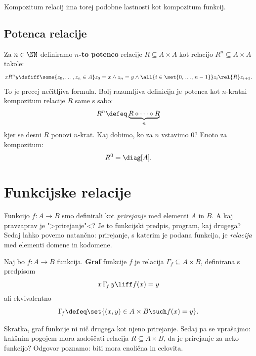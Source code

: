 Kompozitum relacij ima torej podobne lastnosti kot kompozitum funkcij.

\subsection{Potenca relacije}

Za $n \in \NN$ definiramo \textbf{$n$-to potenco} relacije $R \subseteq A \times A$ kot relacijo $R^n \subseteq A \times A$ takole:
%
\begin{equation*}
    x R^n y \defiff
    \some{z_0, \ldots, z_n \in A}
    z_0 = x \land z_n = y \land \all{i \in \set{0, \ldots, n-1}} z_i \rel{R} z_{i+1}.
\end{equation*}
%
To je precej nečitljiva formula. Bolj razumljiva definicija je potenca kot $n$-kratni kompozitum relacije $R$ same s sabo:
%
\begin{equation*}
    R^n \defeq \underbrace{R \circ \cdots \circ R}_n
\end{equation*}
%
kjer se desni $R$ ponovi $n$-krat. Kaj dobimo, ko za $n$ vstavimo $0$? Enoto za kompozitum:
%
\begin{equation*}
    R^0 = \diag[A].
\end{equation*}

\section{Funkcijske relacije}

Funkcijo $f : A \to B$ smo definirali kot \emph{prirejanje} med elementi $A$ in $B$. A
kaj pravzaprav je ">prirejanje"<? Je to funkcijski predpis, program, kaj drugega?
Sedaj lahko povemo natančno: prirejanje, s katerim je podana funkcija, je
\emph{relacija} med elementi domene in kodomene.

\begin{definicija}
  Naj bo $f : A \to B$ funkcija. \textbf{Graf} funkcije $f$ je relacija
  $\Gamma_f \subseteq A \times B$, definirana s predpisom
  \begin{equation*}
    x \,\Gamma_{\!f}\, y \liff f(x) = y
  \end{equation*}
  ali ekvivalentno
  \begin{equation*}
    \Gamma_{\!f} \defeq \set{ (x, y) \in A \times B \such f(x) = y }.
  \end{equation*}
\end{definicija}

Skratka, graf funkcije ni nič drugega kot njeno prirejanje.
%
Sedaj pa se vprašajmo: kakšnim pogojem mora zadoščati relacija $R \subseteq A \times B$, da je prirejanje za neko funkcijo? Odgovor poznamo: biti mora enolična in celovita.

